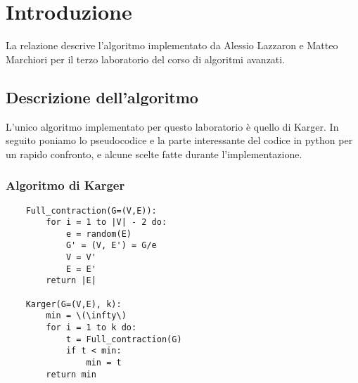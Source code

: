 \chapter{Introduzione\label{sec:introduzione}}
\noindent La relazione descrive l'algoritmo implementato da Alessio Lazzaron e Matteo Marchiori per il terzo laboratorio del corso di algoritmi avanzati.

\section{Descrizione dell'algoritmo\label{sec:descrizione}}
L'unico algoritmo implementato per questo laboratorio è quello di Karger.
In seguito poniamo lo pseudocodice e la parte interessante del codice in python per un rapido confronto, e alcune scelte fatte durante l'implementazione.

\subsection{Algoritmo di Karger\label{sec:karger}}
\begin{verbatim}
    Full_contraction(G=(V,E)):
        for i = 1 to |V| - 2 do:
            e = random(E)
            G' = (V, E') = G/e
            V = V'
            E = E'
        return |E|    
    
    Karger(G=(V,E), k):
        min = \(\infty\)
        for i = 1 to k do:
            t = Full_contraction(G)
            if t < min:
                min = t
        return min                
\end{verbatim}

\clearpage

